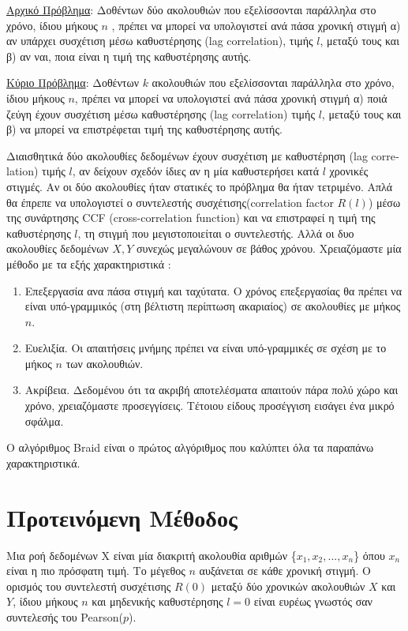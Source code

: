 \documentclass[a4paper,12pt]{article}
\begin{document}
\par \underline{Αρχικό Πρόβλημα}: Δοθέντων δύο ακολουθιών που εξελίσσονται παράλληλα στο χρόνο, ίδιου μήκους $n$ , πρέπει να μπορεί να υπολογιστεί ανά πάσα χρονική στιγμή α) αν υπάρχει συσχέτιση μέσω καθυστέρησης (\textlatin{lag correlation}), τιμής $l$, μεταξύ τους και β) αν ναι, ποια είναι η τιμή της καθυστέρησης αυτής.
\par \underline{Κύριο Πρόβλημα}: Δοθέντων $k$ ακολουθιών που εξελίσσονται παράλληλα στο χρόνο, ίδιου μήκους $n$, πρέπει να μπορεί να υπολογιστεί ανά πάσα χρονική στιγμή α) ποιά ζεύγη έχουν συσχέτιση μέσω καθυστέρησης (\textlatin{lag correlation}) τιμής $l$, μεταξύ τους και β) να μπορεί να επιστρέφεται τιμή της καθυστέρησης αυτής.
\par Διαισθητικά δύο ακολουθίες δεδομένων έχουν συσχέτιση με καθυστέρηση (\textlatin{lag correlation}) τιμής $l$, αν δείχουν σχεδόν ίδιες αν η μία καθυστερήσει κατά $l$ χρονικές στιγμές. Αν οι δύο ακολουθίες ήταν στατικές το πρόβλημα θα ήταν τετριμένο. Απλά θα έπρεπε να υπολογιστεί ο συντελεστής συσχέτισης(\textlatin{correlation factor $R(l)$}) μέσω της συνάρτησης \textlatin{CCF (cross-correlation function)} και να επιστραφεί η τιμή της καθυστέρησης $l$, τη στιγμή που μεγιστοποιείται ο συντελεστής. Αλλά οι δυο ακολουθίες δεδομένων $X,Y$ συνεχώς μεγαλώνουν σε βάθος χρόνου. Χρειαζόμαστε μία μέθοδο με τα εξής χαρακτηριστικά :
\begin{enumerate}
 \item Επεξεργασία ανα πάσα στιγμή και ταχύτατα. Ο χρόνος επεξεργασίας θα πρέπει να είναι υπό-γραμμικός (στη βέλτιστη περίπτωση ακαριαίος) σε ακολουθίες με μήκος $n$.
 \item Eυελιξία. Οι απαιτήσεις μνήμης πρέπει να είναι υπό-γραμμικές σε σχέση με το μήκος $n$ των ακολουθιών.
 \item Ακρίβεια. Δεδομένου ότι τα ακριβή αποτελέσματα απαιτούν πάρα πολύ χώρο και χρόνο, χρειαζόμαστε προσεγγίσεις. Τέτοιου είδους προσέγγιση εισάγει ένα μικρό σφάλμα.
\end{enumerate}
\noindent Ο αλγόριθμος \textlatin{Braid} είναι ο πρώτος αλγόριθμος που καλύπτει όλα τα παραπάνω χαρακτηριστικά.

\section*{Προτεινόμενη Μέθοδος}

\par Μια ροή δεδομένων \textlatin{X} είναι μία διακριτή ακολουθία αριθμών \{$x_1, x_2 , ... , x_n$\} όπου $x_n$ είναι η πιο πρόσφατη τιμή. Το μέγεθος $n$ αυξάνεται σε κάθε χρονική στιγμή. Ο ορισμός του συντελεστή συσχέτισης $R(0)$ μεταξύ δύο χρονικών ακολουθιών $X$ και $Y$, ίδιου μήκους $n$ και μηδενικής καθυστέρησης $l=0$ είναι ευρέως γνωστός σαν συντελεσής του \textlatin{Pearson($p$)}. 
\end{document}
